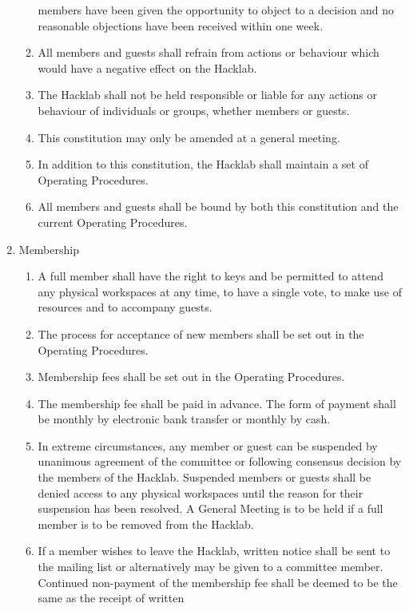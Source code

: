 \documentclass{article}
\begin{document}
\begin{enumerate}
\begin{enumerate}
      members have been given the opportunity to object to a decision
      and no reasonable objections have been received within one week.
    \item All members and guests shall refrain from actions or
      behaviour which would have a negative effect on the Hacklab.
    \item The Hacklab shall not be held responsible or liable for
      any actions or behaviour of individuals or groups, whether
      members or guests.
    \item This constitution may only be amended at a general meeting.
    \item In addition to this constitution, the Hacklab shall maintain
      a set of Operating Procedures.
    \item All members and guests shall be bound by both this
      constitution and the current Operating Procedures.
    \end{enumerate} %
  \item Membership
    \begin{enumerate}
    \item A full member shall have the right to keys and be permitted
      to attend any physical workspaces at any time, to have a single
      vote, to make use of resources and to accompany guests.
    \item The process for acceptance of new members shall be set out
      in the Operating Procedures.
    \item Membership fees shall be set out in the Operating Procedures. 
    \item The membership fee shall be paid in advance. The form of
      payment shall be monthly by electronic bank transfer or monthly
      by cash.
    \item In extreme circumstances, any member or guest can
      be suspended by unanimous agreement of the committee or following
      consensus decision by the members of the Hacklab. Suspended
      members or guests shall be denied access to any physical
      workspaces until the reason for their suspension has been
      resolved. A General Meeting is to be held if a full member is to
      be removed from the Hacklab.
    \item \cbstart If a member wishes to leave the Hacklab, written notice
      shall be sent to the mailing list or alternatively may be given
      to a committee member. Continued non-payment of the membership
      fee shall be deemed to be the same as the receipt of written

\end{enumerate}
\end{enumerate}
\end{document}
